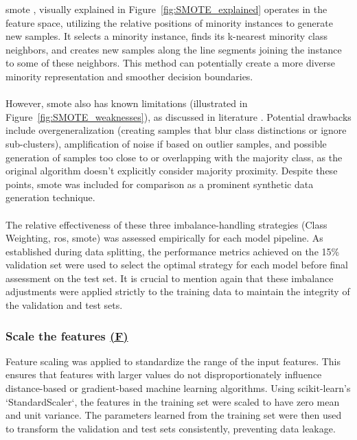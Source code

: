 \documentclass[12pt,a4paper]{report}
\begin{document}
\noindent
\gls{smote} \cite{Chawla2002SMOTE}, visually explained in Figure~\ref{fig:SMOTE_explained} operates in the feature space, utilizing the relative positions of minority instances to generate new samples. It selects a minority instance, finds its k-nearest minority class neighbors, and creates new samples along the line segments joining the instance to some of these neighbors. This method can potentially create a more diverse minority representation and smoother decision boundaries.\\
\\
However, \gls{smote} also has known limitations (illustrated in Figure~\ref{fig:SMOTE_weaknesses}), as discussed in literature \cite{Truong2022SMOTEVariants}. Potential drawbacks include overgeneralization (creating samples that blur class distinctions or ignore sub-clusters), amplification of noise if based on outlier samples, and possible generation of samples too close to or overlapping with the majority class, as the original algorithm doesn't explicitly consider majority proximity. Despite these points, \gls{smote} was included for comparison as a prominent synthetic data generation technique.\\
\\
The relative effectiveness of these three imbalance-handling strategies (Class Weighting, \gls{ros}, \gls{smote}) was assessed empirically for each model pipeline. As established during data splitting, the performance metrics achieved on the 15\% validation set were used to select the optimal strategy for each model before final assessment on the test set. It is crucial to mention again that these imbalance adjustments were applied strictly to the training data to maintain the integrity of the validation and test sets.

\subsubsection*{Scale the features \hyperref[fig:pipeline-1]{(F)}}
Feature scaling was applied to standardize the range of the input features. This ensures that features with larger values do not disproportionately influence distance-based or gradient-based machine learning algorithms. Using scikit-learn's `StandardScaler`, the features in the training set were scaled to have zero mean and unit variance. The parameters learned from the training set were then used to transform the validation and test sets consistently, preventing data leakage.
\end{document}
